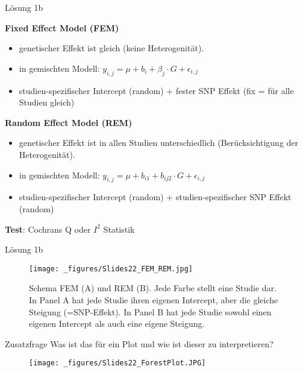 \documentclass{beamer}
\begin{document}
\begin{frame}{Lösung 1b}

    \textbf{Fixed Effect Model (FEM)}

    \begin{itemize}
        \item genetischer Effekt ist gleich (keine Heterogenität). 
        \item in gemischten Modell: $y_{i,j} = \mu + b_i + \beta_j \cdot G + \epsilon_{i,j}$
        \item studien-spezifischer Intercept (random) + fester SNP Effekt (fix = für alle Studien gleich)  
    \end{itemize}

    \textbf{Random Effect Model (REM)}

    \begin{itemize}
        \item genetischer Effekt ist in allen Studien unterschiedlich (Berücksichtigung der Heterogenität). 
        \item in gemischten Modell: $y_{i,j} = \mu + b_{i1} + b_{ij2} \cdot G + \epsilon_{i,j}$
        \item studien-spezifischer Intercept (random) + studien-spezifischer SNP Effekt (random) 
    \end{itemize}

    \textbf{Test}: Cochrans Q oder $I^2$ Statistik
    
\end{frame}

\begin{frame}{Lösung 1b}
\begin{figure}[h]
\begin{center}
\texttt{[image: \_figures/Slides22\_FEM\_REM.jpg]}
\caption{Schema FEM (A) und REM (B). Jede Farbe stellt eine Studie dar. In Panel A hat jede Studie ihren eigenen Intercept, aber die gleiche Steigung (=SNP-Effekt). In Panel B hat jede Studie sowohl einen eigenen Intercept als auch eine eigene Steigung.}
\label{fig:FEM_REM}
\end{center}
\end{figure}
\end{frame}

\begin{frame}{Zusatzfrage}
    Was ist das für ein Plot und wie ist dieser zu interpretieren? 

\begin{figure}[h]
\begin{center}
\texttt{[image: \_figures/Slides22\_ForestPlot.JPG]}
\label{fig:Forestplot}
\end{center}
\end{figure}
    
\end{frame}
\end{document}
